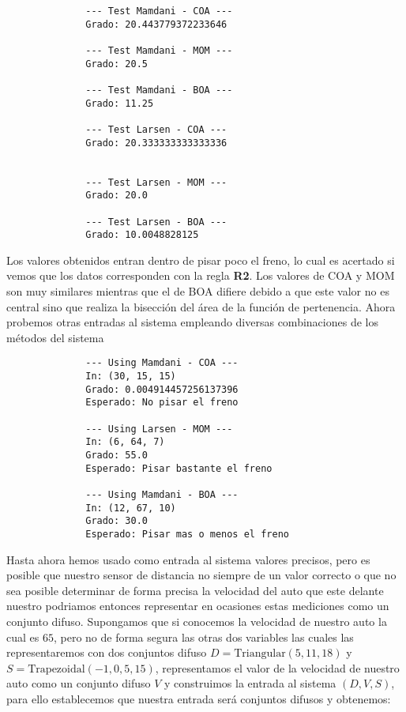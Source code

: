 \documentclass[a4paper,10pt,twocolumn]{article}
\begin{document}
\begin{verbatim}
	          --- Test Mamdani - COA --- 
	          Grado: 20.443779372233646
	
	          --- Test Mamdani - MOM --- 
	          Grado: 20.5
	
	          --- Test Mamdani - BOA --- 
	          Grado: 11.25
	
	          --- Test Larsen - COA --- 
	          Grado: 20.333333333333336
	
	
	          --- Test Larsen - MOM --- 
	          Grado: 20.0
	
	          --- Test Larsen - BOA --- 
	          Grado: 10.0048828125
\end{verbatim}

Los valores obtenidos entran dentro de pisar poco el freno, lo cual es acertado si vemos que los datos corresponden con la regla \textbf{R2}. Los valores de COA y MOM son muy similares mientras que el de BOA difiere debido a que este valor no es central sino que realiza la bisecci\'on del \'area de la funci\'on de pertenencia. Ahora probemos otras entradas al sistema empleando diversas combinaciones de los m\'etodos del sistema

\begin{verbatim}
	          --- Using Mamdani - COA --- 
	          In: (30, 15, 15) 
	          Grado: 0.004914457256137396
	          Esperado: No pisar el freno
	
	          --- Using Larsen - MOM --- 
	          In: (6, 64, 7)
	          Grado: 55.0
	          Esperado: Pisar bastante el freno
	
	          --- Using Mamdani - BOA --- 
	          In: (12, 67, 10)
	          Grado: 30.0
	          Esperado: Pisar mas o menos el freno
\end{verbatim}

Hasta ahora hemos usado como entrada al sistema valores precisos, pero es posible que nuestro sensor de distancia no siempre de un valor correcto o que no sea posible determinar de forma precisa la velocidad del auto que este delante nuestro podriamos entonces representar en ocasiones estas mediciones como un conjunto difuso. Supongamos que si conocemos la velocidad de nuestro auto la cual es $65$, pero no de forma segura las otras dos variables las cuales las representaremos con dos conjuntos difuso $D = \text{Triangular} (5, 11, 18)$ y $S = \text{Trapezoidal} (-1, 0, 5, 15)$, representamos el valor de la velocidad de nuestro auto como un conjunto difuso $V$ y construimos la entrada al sistema $(D, V, S)$, para ello establecemos que nuestra entrada ser\'a conjuntos difusos y obtenemos:
\end{document}
